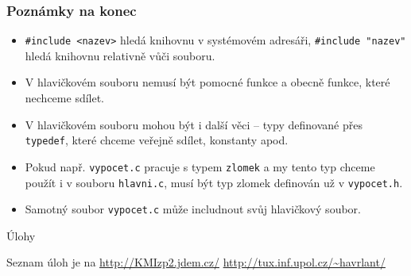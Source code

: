 \documentclass{beamer}
\begin{document}
\begin{frame}[t,fragile]\frametitle{Poznámky na konec} 
    \begin{itemize}
        \item \texttt{\#include <nazev>} hledá knihovnu v systémovém adresáři, \texttt{\#include "nazev"} hledá knihovnu relativně vůči souboru.
        \item V hlavičkovém souboru nemusí být pomocné funkce a obecně funkce, které nechceme sdílet. 
        \item V hlavičkovém souboru mohou být i další věci -- typy definované přes \texttt{typedef}, které chceme veřejně sdílet, konstanty apod. 
        \item Pokud např. \texttt{vypocet.c} pracuje s typem \texttt{zlomek} a my tento typ chceme použít i v souboru \texttt{hlavni.c}, musí být typ zlomek definován už v \texttt{vypocet.h}.
        \item Samotný soubor \texttt{vypocet.c} může includnout svůj hlavičkový soubor. 
    \end{itemize}
\end{frame}


\begin{frame}[t,fragile]{Úlohy}
\begin{center}
\vskip 1cm
{\Large Seznam úloh je na \url{http://KMIzp2.jdem.cz/}}
\vskip 2cm
\url{http://tux.inf.upol.cz/~havrlant/}
\end{center}
\end{frame}
\end{document}
